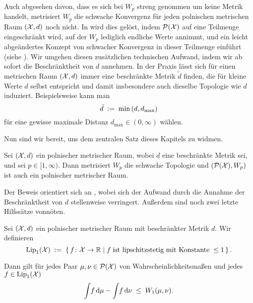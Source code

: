\documentclass[../thesis/thesis.tex]{subfiles}
\begin{document}
	Auch abgesehen davon, dass es sich bei $W_p$ streng genommen um keine Metrik handelt, metrisiert $W_p$ die schwache Konvergenz für jeden polnischen metrischen Raum $(\mathcal{X}, d)$ noch nicht.
	In \cite{Villani.2009} wird dies gelöst, indem $\mathcal{P}(\mathcal{X})$ auf eine Teilmenge eingeschränkt wird, auf der $W_p$ lediglich endliche Werte annimmt, und ein leicht abgeändertes Konzept
	von schwacher Konvergenz in dieser Teilmenge einführt (siehe \cite[Definition 6.4 und 6.8]{Villani.2009}). Wir umgehen diesen zusätzlichen technischen Aufwand, 
	indem wir ab sofort die Beschränktheit von $d$ annehmen.
	In der Praxis lässt sich für einen metrischen Raum $(\mathcal{X}, d)$ immer eine beschränkte Metrik $\tilde{d}$ finden, die für kleine Werte $d$ selbst entspricht und damit insbesondere auch dieselbe Topologie wie $d$ induziert. Beispielsweise kann man
	\[ \tilde{d} \; \vcentcolon = \; \min \left(d, d_{\max}\right) \]
	für eine gewisse maximale Distanz $d_{\max} \in (0, \infty)$ wählen.

	Nun sind wir bereit, uns dem zentralen Satz dieses Kapitels zu widmen.

	\begin{Satz}
		\label{satz:wassersteinmetrik_schwache_konvergenz}
		Sei $(\mathcal{X}, d)$ ein polnischer metrischer Raum, wobei $d$ eine beschränkte Metrik sei, und sei $p \in [1, \infty)$. Dann metrisiert $W_p$ die schwache
		Topologie und $(\mathcal{P}(\mathcal{X}), W_p)$ ist auch ein polnischer metrischer Raum.
	\end{Satz}

	Der Beweis orientiert sich an \cite[Theorem 6.9 und Corollary 6.13]{Villani.2009}, wobei sich der Aufwand durch die Annahme der Beschränktheit von $d$ stellenweise verringert.
	Außerdem sind noch zwei letzte Hilfssätze vonnöten.
	
	\begin{Hilfssatz}
		\label{hilfssatz:dualitätsformel_von_kantorovich_rubinstein}
		Sei $(\mathcal{X}, d)$ ein polnischer metrischer Raum mit beschränkter Metrik $d$. Wir definieren
		\[ \mathrm{Lip}_1(\mathcal{X}) \; \vcentcolon = \; \left\{\, f \colon \mathcal{X} \to \mathbb{R} \; \middle| \; f \; \text{ist lipschitzstetig mit Konstante} \; \leq 1  \,\right\} \text{.} \]
		
		Dann gilt für jedes Paar $\mu, \nu \in \mathcal{P}(\mathcal{X})$ von Wahrscheinlichkeitsmaßen und jedes $f \in \mathrm{Lip}_1(\mathcal{X})$
		\[ \int_{} \, f \, \mathrm{d}\mu - \int_{} \, f \, \mathrm{d}\nu \; \leq \; W_1(\mu, \nu) \text{.} \]
	\end{Hilfssatz}
\end{document}
